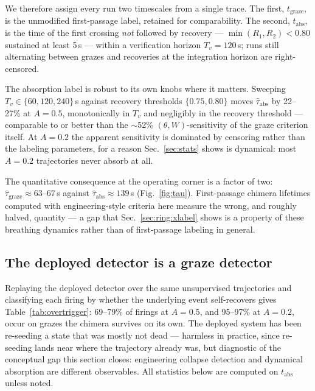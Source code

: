 \documentclass[pdflatex,sn-mathphys,Numbered]{sn-jnl}
\begin{document}
We therefore assign every run two timescales from a single trace. The first,
$t_{\mathrm{graze}}$, is the unmodified first-passage label, retained for
comparability. The second, $t_{\mathrm{abs}}$, is the time of the first crossing
\emph{not} followed by recovery --- $\min(R_1, R_2) < 0.80$ sustained at least
5\,s --- within a verification horizon $T_v = 120$\,s; runs still alternating
between grazes and recoveries at the integration horizon are right-censored.

The absorption label is robust to its own knobs where it matters. Sweeping
$T_v \in \{60, 120, 240\}$\,s against recovery thresholds $\{0.75, 0.80\}$ moves
$\hat\tau_{\mathrm{abs}}$ by 22--27\% at $A = 0.5$, monotonically in $T_v$ and
negligibly in the recovery threshold --- comparable to or better than the
$\sim$52\% $(\theta, W)$-sensitivity of the graze criterion itself. At $A = 0.2$
the apparent sensitivity is dominated by censoring rather than the labeling
parameters, for a reason Sec.~\ref{sec:stats} shows is dynamical: most $A = 0.2$
trajectories never absorb at all.

The quantitative consequence at the operating corner is a factor of two:
$\hat\tau_{\mathrm{graze}} \approx 63$--$67$\,s against
$\hat\tau_{\mathrm{abs}} \approx 139$\,s (Fig.~\ref{fig:tau}). First-passage chimera
lifetimes computed with engineering-style criteria here measure the wrong,
and roughly halved, quantity --- a gap that
Sec.~\ref{sec:ring:xlabel} shows is a property of these breathing dynamics
rather than of first-passage labeling in general.

\subsection{The deployed detector is a graze detector}

Replaying the deployed detector over the same unsupervised trajectories and
classifying each firing by whether the underlying event self-recovers gives
Table~\ref{tab:overtrigger}: 69--79\% of firings at $A = 0.5$, and 95--97\% at
$A = 0.2$, occur on grazes the chimera survives on its own. The deployed system has
been re-seeding a state that was mostly not dead --- harmless in practice, since
re-seeding lands near where the trajectory already was, but diagnostic of the
conceptual gap this section closes: engineering collapse detection and dynamical
absorption are different observables. All statistics below are computed on
$t_{\mathrm{abs}}$ unless noted.
\end{document}
